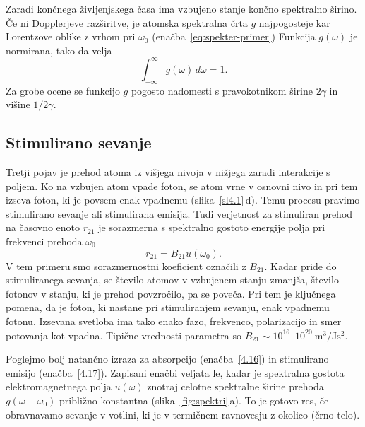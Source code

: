 Zaradi končnega življenjskega časa ima vzbujeno stanje končno spektralno 
širino. Če ni Dop\-pler\-je\-ve razširitve, je atomska spektralna 
črta $g$  najpogosteje kar 
Lorentzove oblike z vrhom pri $\omega_0$
(enačba~\ref{eq:spekter-primer})
Funkcija $g(\omega)$ je normirana, tako da velja
\begin{equation}
\int_{-\infty}^\infty g(\omega)\, d\omega=1.
\label{4.20}
\end{equation}
Za grobe ocene se funkcijo $g$ pogosto nadomesti s pravokotnikom širine
$2\gamma$ in višine $1/2\gamma$.


\subsection*{Stimulirano sevanje}
Tretji pojav je prehod atoma iz višjega nivoja v nižjega zaradi interakcije
s poljem. Ko na vzbujen atom vpade foton, se atom vrne v osnovni nivo in pri 
tem izseva foton, ki je povsem enak vpadnemu (slika~\ref{sl4.1}\,d). 
Temu procesu pravimo stimulirano sevanje ali 
stimulirana emisija. Tudi verjetnost za stimuliran prehod na časovno enoto $r_{21}$ 
je sorazmerna s spektralno gostoto energije polja pri frekvenci prehoda $\omega_{0}$
\begin{equation}
r_{21}=B_{21}u(\omega_{0}).
\label{4.17}
\end{equation}
V tem primeru smo sorazmernostni koeficient označili z $B_{21}$. Kadar pride do
stimuliranega sevanja, se število atomov v vzbujenem stanju zmanjša, 
število fotonov v stanju, ki je prehod povzročilo, pa se poveča. Pri tem je 
ključnega pomena, da je foton, ki nastane pri stimuliranjem sevanju, enak vpadnemu fotonu.
Izsevana svetloba ima tako enako fazo, frekvenco, polarizacijo in smer potovanja kot 
vpadna. Tipične vrednosti parametra so $B_{21} \sim 10^{16}$--$10^{20}~\si{\metre^3/\joule\second^2}$.

Poglejmo bolj natančno izraza za absorpcijo
(enačba~\ref{4.16}) in stimulirano emisijo (enačba~\ref{4.17}).
Zapisani enačbi veljata le, kadar je spektralna gostota 
elektromagnetnega polja $u(\omega)$
znotraj celotne spektralne širine prehoda $g(\omega - \omega_0)$ približno konstantna 
(slika~\ref{fig:spektri}\,a). To je gotovo res, če
obravnavamo sevanje v votlini, ki je v termičnem ravnovesju z okolico (črno telo).

